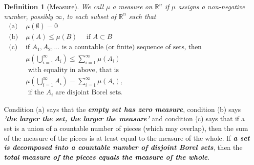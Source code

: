 \documentclass[12pt, a4paper]{article}
\newtheorem{definition}{Definition}[subsection]
\begin{document}
\begin{definition}[Measure]\label{measure}
    We call $\mu$ a measure on $\mathbb{R}^{n}$ if $\mu$ assigns a non-negative number, possibly $\infty$, to each subset of $\mathbb{R}^{n}$ such that\\
$
\begin{aligned}
\text { (a) }& \mu(\emptyset)=0 \\
\text { (b) }& \mu(A) \leq \mu(B) \quad \text { if } A \subset B \\
\text { (c) }&\text{if } A_{1}, A_{2}, \ldots \text{ is a countable (or finite) sequence of sets, then }\\
& \mu\left(\bigcup_{i=1}^{\infty} A_{i}\right) \leq \sum_{i=1}^{\infty} \mu\left(A_{i}\right)\\
& \text{ with equality in above, that is }\\
& \mu\left(\bigcup_{i=1}^{\infty} A_{i}\right)=\sum_{i=1}^{\infty} \mu\left(A_{i}\right), \\
&\text{ if the }A_i \text{ are disjoint Borel sets.}
\end{aligned}
$
\end{definition}

Condition (a) says that the \textit{\textbf{empty set has
zero measure}}, condition (b) says \textit{\textbf{'the larger the set, the larger the measure'}} and condition (c) says that if a set is a union of a countable number of pieces (which may overlap), then the sum of the measure of the pieces is at least equal to the measure of the whole. If \textit{\textbf{a set is decomposed into a countable number of disjoint Borel sets}}, then the \textit{\textbf{total measure of the pieces equals the measure of the whole}}.
\end{document}
